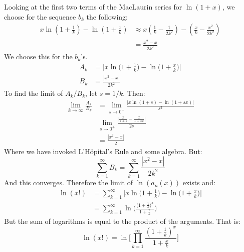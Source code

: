 \documentclass[crop=false,class=book,oneside]{standalone}
\begin{document}
        Looking at the first two terms of the MacLaurin series for
        $\ln(1+x)$, we choose for the sequence $b_{k}$ the following:
        \begin{align}
            x\ln(1+\frac{1}{k})-\ln(1+\frac{x}{k})
            &\approx
            x(\frac{1}{k}-\frac{1}{2k^{2}})
            -(\frac{x}{k}-\frac{x^{2}}{2k^{2}})\\
            &=\frac{x^{2}-x}{2k^{2}}
        \end{align}
        We choose this for the $b_{k}$'s.
        \begin{align}
            A_{k}&=
            \Big|x\ln\big(1+\frac{1}{k}\big)-\ln\big(1+\frac{x}{k}\big)\Big|\\
            B_{k}&=\frac{|x^{2}-x|}{2k^{2}}
        \end{align}
        To find the limit of $A_{k}/B_{k}$, let $s=1/k$. Then:
        \begin{align}
            \underset{k\rightarrow\infty}{\lim}\frac{A_{k}}{B_{k}}
            &=\underset{s\rightarrow{0}^{+}}{\lim}
            \frac{|x\ln(1+s)-\ln(1+sx)|}{s^{2}}\\
            &\underset{s\rightarrow{0}^{+}}{\lim}
            \frac{\big|\frac{x}{1+s}-\frac{x}{1+sx}\big|}{2s}\\
            &=\frac{|x^{2}-x|}{2}
        \end{align}
        Where we have invoked L'H\"{o}pital's Rule and some algebra.
        But:
        \begin{equation}
            \sum_{k=1}^{\infty}B_{k}=
            \sum_{k=1}^{\infty}\frac{|x^{2}-x|}{2k^{2}}
        \end{equation}
        And this converges. Therefore the limit of $\ln(a_{n}(x))$ exists
        and:
        \begin{align}
            \ln(x!)&=\sum_{k=1}^{\infty}\Big[
                x\ln\big(1+\frac{1}{k}\big)-\ln\big(1+\frac{x}{k}\big)\Big]\\
            &=\sum_{k=1}^{\infty}
                \ln\Big(
                    \frac{\big(1+\frac{1}{k}\big)^{x}}{1+\frac{x}{k}}
                    \Big)
        \end{align}
        But the sum of logarithms is equal to the product of the arguments.
        That is:
        \begin{equation}
            \ln(x!)=
            \ln\Big[
                \prod_{k=1}^{\infty}\frac{(1+\frac{1}{k})^{x}}{1+\frac{x}{k}}
            \Big]
        \end{equation}
\end{document}
